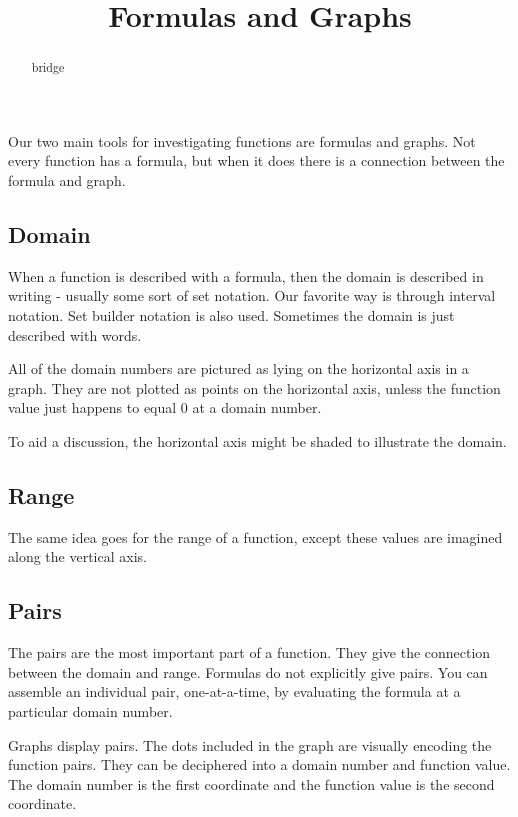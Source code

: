 \documentclass{ximera}
\title{Formulas and Graphs}
\begin{document}
\begin{abstract}
bridge
\end{abstract}
\maketitle



Our two main tools for investigating functions are formulas and graphs. Not every function has a formula, but when it does there is a connection between the formula and graph.

\subsection{Domain}
When a function is described with a formula, then the domain is described in writing - usually some sort of set notation.  Our favorite way is through interval notation.  Set builder notation is also used.  Sometimes the domain is just described with words.

All of the domain numbers are pictured as lying on the horizontal axis in a graph.  They are not plotted as points on the horizontal axis, unless the function value just happens to equal $0$ at a domain number.

To aid a discussion, the horizontal axis might be shaded to illustrate the domain.







\subsection{Range}
The same idea goes for the range of a function, except these values are imagined along the vertical axis.








\subsection{Pairs}
The pairs are the most important part of a function.  They give the connection between the domain and range.  Formulas do not explicitly give pairs. You can assemble an individual pair, one-at-a-time, by evaluating the formula at a particular domain number.

Graphs display pairs.  The dots included in the graph are visually encoding the function pairs.  They can be deciphered into a domain number and function value. The domain number is the first coordinate and the function value is the second coordinate.
\end{document}
